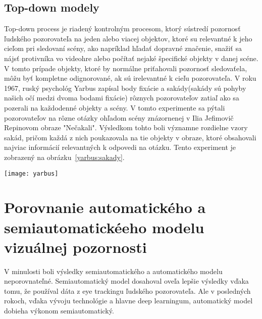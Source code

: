 \documentclass[10pt,twoside,slovak,a4paper]{article}
\begin{document}
\subsection{Top-down modely} \label{nejaka}
Top-down process je riadený kontrolným procesom, ktorý sústredí pozornosť ľudského pozorovateľa na jeden alebo viacej objektov, ktoré su relevantné k jeho cieľom pri sledovaní scény, ako napríklad hľadať dopravné značenie, snažiť sa nájsť  protivníka vo videohre alebo počítať nejaké špecifické objekty v danej scéne. V tomto prípade objekty, ktoré by normálne priťahovali pozornosť sledovaťela, môžu byť kompletne odignorované, ak sú irelevantné k cieľu pozorovateľa. V roku 1967, ruský psychológ Yarbus zapísal body fixácie a sakády(sakády sú pohyby našich očí medzi dvoma bodami fixácie) rôznych pozorovateľov zatiaľ ako sa pozerali na každodenné objekty a scény. V tomto experimente sa pýtali pozorovateľov na rôzne otázky ohľadom scény znázornenej v Ilia Jefimovič Repinovom  obraze "Nečakali". Výsledkom tohto boli významne rozdielne vzory sakád, pričom každá z nich poukazovala na tie objekty v obraze, ktoré obsahovali najviac informácií relevantných k odpovedi na otázku. Tento experiment je zobrazený na obrázku~\ref{yarbus:sakady}.
\begin{figure*}[tbh]
\centering
\texttt{[image: yarbus]}
\caption{ Dopad úloh na pohyb očí. Repinov obraz bol pozorovaný subjektami s rozlišnými inštrukciami(obrázky idú v poradí z ľava do prava z hora dole):1. Voľné pozorovanie, 2. Odhadnite ich vek, 3. Zistite čo robili pred tým ako sa ukázal nečakaný hosť, 4. Zapamätajte si oblečenie ktoré majú na sebe postavy oblečené, 5. Zapamätajte si pozíciu ľudí a objektov v izbe a 6. Predpovedajte, ako dlho bol nečakaný hosť preč od danej rodiny[Yarbus 1967].}
\label{yarbus:sakady}
\end{figure*}


\section{Porovnanie automatického a semiautomatickéeho modelu vizuálnej pozornosti} \label{porovnanie}
V minulosti boli výsledky semiautomatického a automatického modelu neporovnateľné. Semiautomatický model dosahoval oveľa lepšie výsledky vďaka tomu, že používal dáta z eye trackingu ľudského pozorovateľa. Ale v posledných rokoch, vďaka vývoju technológie a hlavne deep learningum, automatický model dobieha výkonom semiautomatický.
\end{document}
